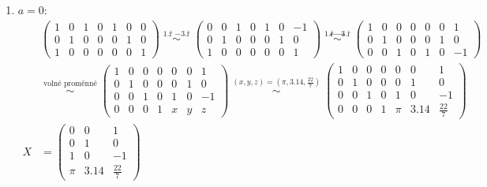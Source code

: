 \documentclass[12pt]{article}
\begin{document}
\begin{enumerate}
\begin{enumerate}
\begin{enumerate}
              \item $a=0$:
                \begin{align*}
                  &\left(\begin{array}{cccc|ccc}
                    1 & 0 & 1 & 0 & 1 & 0 & 0 \\
                    0 & 1 & 0 & 0 & 0 & 1 & 0 \\
                    1 & 0 & 0 & 0 & 0 & 0 & 1
                  \end{array}\right)
                  \overset{\text{1.ř } -\text{3.ř}}{\;\sim\;}
                  \left(\begin{array}{cccc|ccc}
                    0 & 0 & 1 & 0 & 1 & 0 & -1 \\
                    0 & 1 & 0 & 0 & 0 & 1 & 0 \\
                    1 & 0 & 0 & 0 & 0 & 0 & 1
                  \end{array}\right)
                  \overset{\text{1.ř} \leftrightarrow \text{3.ř}}{\;\sim\;}
                  \left(\begin{array}{cccc|ccc}
                    1 & 0 & 0 & 0 & 0 & 0 & 1 \\
                    0 & 1 & 0 & 0 & 0 & 1 & 0 \\
                    0 & 0 & 1 & 0 & 1 & 0 & -1
                  \end{array}\right)
                \\
                  &\overset{\text{volné proměnné}}{\;\sim\;}
                  \left(\begin{array}{cccc|ccc}
                    1 & 0 & 0 & 0 & 0 & 0 & 1 \\
                    0 & 1 & 0 & 0 & 0 & 1 & 0 \\
                    0 & 0 & 1 & 0 & 1 & 0 & -1 \\ \hline
                    0 & 0 & 0 & 1 & x & y & z
                  \end{array}\right)
                  \overset{(x,y,z)=(\pi, 3.14, \frac{22}{7})}{\;\sim\;}
                  \left(\begin{array}{cccc|ccc}
                    1 & 0 & 0 & 0 & 0 & 0 & 1 \\
                    0 & 1 & 0 & 0 & 0 & 1 & 0 \\
                    0 & 0 & 1 & 0 & 1 & 0 & -1 \\ \hline
                    0 & 0 & 0 & 1 & \pi & 3.14 & \frac{22}{7}
                  \end{array}\right)
                \\
                  X &= \left(\begin{array}{ccc}
                    0 & 0 & 1 \\
                    0 & 1 & 0 \\
                    1 & 0 & -1 \\
                    \pi & 3.14 & \frac{22}{7}
                  \end{array}\right)
                \end{align*}
          \end{enumerate}


\end{enumerate}
\end{enumerate}
\end{document}
